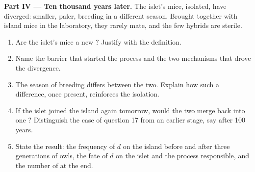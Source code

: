 \begin{problem}
\medskip
\noindent\textbf{Part IV --- Ten thousand years later.}
The islet's mice, isolated, have diverged: smaller, paler, breeding in a
different season. Brought together with island mice in the laboratory,
they rarely mate, and the few hybrids are sterile.
\begin{enumerate}[resume]
  \item Are the islet's mice a new ? Justify with the
        definition.
  \item Name the barrier that started the process and the two
        mechanisms that drove the divergence.
  \item The season of breeding differs between the two. Explain how
        such a difference, once present, reinforces the isolation.
  \item If the islet joined the island again tomorrow, would the two
        merge back into one ? Distinguish the case of
        question 17 from an earlier stage, say after 100 years.
  \item State the result: the frequency of $d$ on the island before and
        after three generations of owls, the fate of $d$ on the islet
        and the process responsible, and the number of  at the
        end.
\end{enumerate}
\end{problem}
